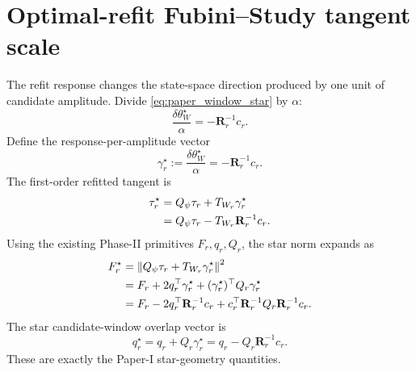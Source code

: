 \documentclass[10pt,twocolumn]{article}
\begin{document}
\section{Optimal-refit Fubini--Study tangent scale}

The refit response changes the state-space direction produced by one unit of candidate amplitude. Divide \eqref{eq:paper_window_star} by \(\alpha\):
\begin{equation}
\frac{\delta\theta_W^\star}{\alpha}
=-\mathbf R_r^{-1}c_r.
\label{eq:window_response_per_alpha}
\end{equation}
Define the response-per-amplitude vector
\begin{equation}
\gamma_r^\star
:=\frac{\delta\theta_W^\star}{\alpha}
=-\mathbf R_r^{-1}c_r.
\label{eq:gamma_star_nocedal}
\end{equation}
The first-order refitted tangent is
\begin{align}
\tau_r^\star
&=
Q_\psi\tau_r
+T_{W_r}\gamma_r^\star
\notag\\
&=
Q_\psi\tau_r
-T_{W_r}\mathbf R_r^{-1}c_r.
\label{eq:tau_star_paper}
\end{align}
Using the existing Phase-II primitives \(F_r,q_r,Q_r\), the star norm expands as
\begin{align}
F_r^\star
&=
\left\|
Q_\psi\tau_r
+T_{W_r}\gamma_r^\star
\right\|^2
\notag\\
&=
F_r
+2q_r^\top\gamma_r^\star
+(\gamma_r^\star)^\top Q_r\gamma_r^\star
\notag\\
&=
F_r-2q_r^\top\mathbf R_r^{-1}c_r
+c_r^\top\mathbf R_r^{-1}Q_r\mathbf R_r^{-1}c_r.
\label{eq:F_star_paper}
\end{align}
The star candidate-window overlap vector is
\begin{equation}
q_r^\star
=q_r+Q_r\gamma_r^\star
=q_r-Q_r\mathbf R_r^{-1}c_r.
\label{eq:q_star_paper}
\end{equation}
These are exactly the Paper-I star-geometry quantities.
\end{document}
